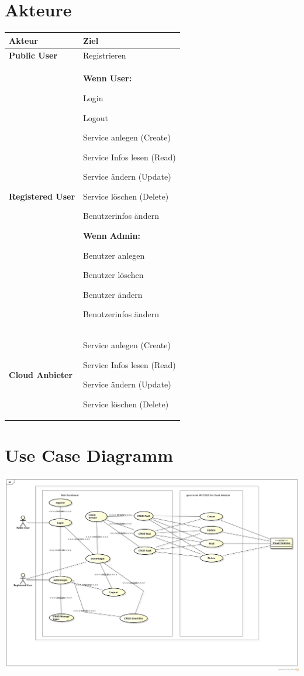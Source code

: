 
\section{Akteure}
\begin{tabularx}{\linewidth}{X X}
\textbf{Akteur} & \textbf{Ziel}\\
\hline
\textbf{Public User} &
Registrieren
\\
\hline
\textbf{Registered User} & 
\textbf{Wenn User:}

Login

Logout

Service anlegen (Create)

Service Infos lesen (Read)

Service ändern (Update)

Service löschen (Delete)

Benutzerinfos ändern

\textbf{Wenn Admin:}

Benutzer anlegen

Benutzer löschen

Benutzer ändern

Benutzerinfos ändern

\\
\hline
\textbf{Cloud Anbieter} &
Service anlegen (Create)

Service Infos lesen (Read)

Service ändern (Update)

Service löschen (Delete)
\\

\end{tabularx}


\section{Use Case Diagramm}

\includegraphics[width=\textwidth]{./03_Analyse/04_UseCases/images/UseCase-Skizzen}


